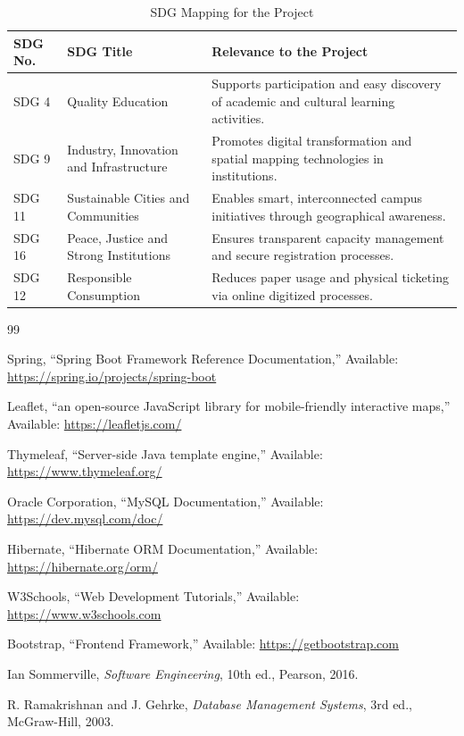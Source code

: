 \documentclass[10pt]{report}
\begin{document}
\begin{table}[h]
\centering

\caption{SDG Mapping for the Project}

\begin{tabular}{|p{2cm}|p{4cm}|p{8cm}|}
\hline
\textbf{SDG No.} & \textbf{SDG Title} & \textbf{Relevance to the Project} \\ \hline

SDG 4 & Quality Education & Supports participation and easy discovery of academic and cultural learning activities. \\ \hline

SDG 9 & Industry, Innovation and Infrastructure & Promotes digital transformation and spatial mapping technologies in institutions. \\ \hline

SDG 11 & Sustainable Cities and Communities & Enables smart, interconnected campus initiatives through geographical awareness. \\ \hline

SDG 16 & Peace, Justice and Strong Institutions & Ensures transparent capacity management and secure registration processes. \\ \hline

SDG 12 & Responsible Consumption & Reduces paper usage and physical ticketing via online digitized processes. \\ \hline

\end{tabular}
\end{table}
 \renewcommand{\bibname}{}

\renewcommand\bibname{References}
\begin{thebibliography}{99}
\RaggedRight

Spring, ``Spring Boot Framework Reference Documentation,'' Available: \url{https://spring.io/projects/spring-boot}

Leaflet, ``an open-source JavaScript library for mobile-friendly interactive maps,'' Available: \url{https://leafletjs.com/}

Thymeleaf, ``Server-side Java template engine,'' Available: \url{https://www.thymeleaf.org/}

Oracle Corporation, ``MySQL Documentation,'' Available: \url{https://dev.mysql.com/doc/}

Hibernate, ``Hibernate ORM Documentation,'' Available: \url{https://hibernate.org/orm/}

W3Schools, ``Web Development Tutorials,'' Available: \url{https://www.w3schools.com}

Bootstrap, ``Frontend Framework,'' Available: \url{https://getbootstrap.com}

Ian Sommerville, \textit{Software Engineering}, 10th ed., Pearson, 2016.

R. Ramakrishnan and J. Gehrke, \textit{Database Management Systems}, 3rd ed., McGraw-Hill, 2003.

\end{thebibliography}
\end{document}
